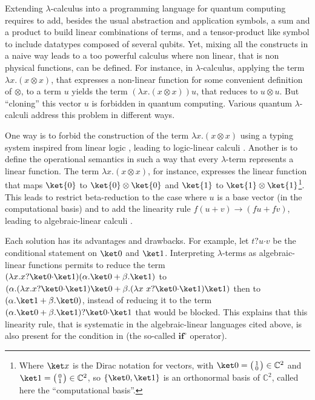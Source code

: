 \documentclass[preprint]{elsarticle}
\newcommand\ite[3]{{#1}?{#2}\mathord{\cdot}{#3}}
\newcommand\pair[2]{({#1}+{#2})}
\begin{document}
Extending $\lambda$-calculus into a programming language for quantum computing
requires to add, besides the usual abstraction and application symbols, a sum
and a product to build linear combinations of terms, and a tensor-product like
symbol to include datatypes composed of several qubits. Yet, mixing all the
constructs in a naive way leads to a too powerful calculus where non linear,
that is non physical functions, can be defined. For instance, in $\lambda$-calculus, applying the term $\lambda x.(x \otimes x)$, that
expresses a non-linear function for some convenient definition of $\otimes$, to
a term $u$ yields the term $(\lambda x.(x \otimes x))u$, that reduces to $u
\otimes u$. But ``cloning'' this vector $u$ is forbidden in quantum computing.
Various quantum $\lambda$-calculi address this problem in different ways.

One way is to forbid the construction of the term $\lambda x.(x \otimes x)$
using a typing system inspired from linear logic
\cite{GirardTCS87,AbramskyTCS93}, leading to logic-linear calculi
\cite{AltenkirchGrattageLICS05,SelingerValironSTQC09,GreenLeFanulumsdaineRossSelingerValironPLDI13,PaganiSelingerValironPOPL14,ZorziMSCS16}.
Another is to define the operational semantics in such a way that every $\lambda$-term represents a linear function. The term
$\lambda x.(x \otimes x)$, for instance, expresses the linear function that maps
$\ket{0}$ to $\ket{0} \otimes \ket{0}$ and $\ket{1}$ to $\ket{1} \otimes
\ket{1}$\footnote{Where $\ket x$ is the Dirac notation for vectors, with $\ket
  0=\bigl( \begin{smallmatrix}1\\0\end{smallmatrix}\bigr)\in\mathbb C^2$ and
  $\ket 1=\bigl( \begin{smallmatrix}0\\1\end{smallmatrix}\bigr)\in\mathbb C^2$,
  so $\{\ket 0,\ket 1\}$ is an orthonormal basis of $\mathbb C^2$, called here
  the ``computational basis''.}. This leads to restrict beta-reduction to the
case where $u$ is a base vector (in the computational basis) and to add the
linearity rule $f\pair uv \longrightarrow\pair{fu}{fv}$, leading to
algebraic-linear calculi \cite{ArrighiDowekRTA08, ArrighiDiazcaroLMCS12,
  DiazcaroPetitWoLLIC12,
  ArrighiDiazcaroValironIC17,AssafDiazcaroPerdrixTassonValironLMCS14}.

Each solution has its advantages and drawbacks. For example, let $\ite tuv$ be
the conditional statement on $\ket 0$ and $\ket 1$. Interpreting $\lambda$-terms
as algebraic-linear functions permits to reduce the term $(\lambda x.\ite x
{\ket 0} {\ket 1}) \pair{\alpha.\ket 0} {\beta.\ket 1}$ to
$\pair{\alpha.(\lambda x.\ite x {\ket 0} {\ket 1}) {\ket 0}} {\beta.(\lambda
  x~\ite x {\ket 0} {\ket 1}) {\ket 1}}$ then to $\pair {\alpha.\ket 1}
{\beta.\ket 0}$, instead of reducing it to the term $\ite {\pair{\alpha.\ket 0}
  {\beta.\ket 1}} {\ket 0} {\ket 1}$ that would be blocked. This explains that
this linearity rule, that is systematic in the algebraic-linear languages cited
above, is also present for the condition in \cite{AltenkirchGrattageLICS05} (the
so-called $\mathbf{if}^\circ$ operator).
\end{document}
